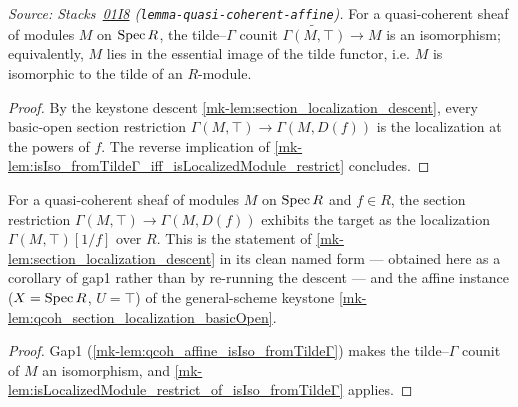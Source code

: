 \begin{lemma}
  \label{mk-lem:qcoh_affine_isIso_fromTildeΓ}
  \leanok

  \textit{Source: Stacks~\href{https://stacks.math.columbia.edu/tag/01I8}{01I8}
  (\texttt{lemma-quasi-coherent-affine}).}
  For a quasi-coherent sheaf of modules \(M\) on \(\operatorname{Spec} R\), the tilde--\(\Gamma\)
  counit \(\widetilde{\Gamma(M, \top)} \to M\) is an isomorphism; equivalently, \(M\)
  lies in the essential image of the tilde functor, i.e. \(M\) is isomorphic to the
  tilde of an \(R\)-module.
\end{lemma}
\begin{proof}
  \leanok
  By the keystone descent \ref{mk-lem:section_localization_descent}, every basic-open
  section restriction \(\Gamma(M, \top) \to \Gamma(M, D(f))\) is the localization at the
  powers of \(f\). The reverse implication of
  \ref{mk-lem:isIso_fromTildeΓ_iff_isLocalizedModule_restrict} concludes.
\end{proof}

\begin{lemma}
  \label{mk-lem:qcoh_affine_section_localization}
  \leanok

  For a quasi-coherent sheaf of modules \(M\) on \(\operatorname{Spec} R\) and \(f \in R\), the
  section restriction \(\Gamma(M, \top) \to \Gamma(M, D(f))\) exhibits the target as the
  localization \(\Gamma(M, \top)[1/f]\) over \(R\). This is the statement of
  \ref{mk-lem:section_localization_descent} in its clean named form — obtained here as a
  corollary of gap1 rather than by re-running the descent — and the affine instance
  (\(X = \operatorname{Spec} R\), \(U = \top\)) of the general-scheme keystone
  \ref{mk-lem:qcoh_section_localization_basicOpen}.
\end{lemma}
\begin{proof}
  \leanok
  Gap1 (\ref{mk-lem:qcoh_affine_isIso_fromTildeΓ}) makes the tilde--\(\Gamma\) counit of
  \(M\) an isomorphism, and
  \ref{mk-lem:isLocalizedModule_restrict_of_isIso_fromTildeΓ} applies.
\end{proof}


